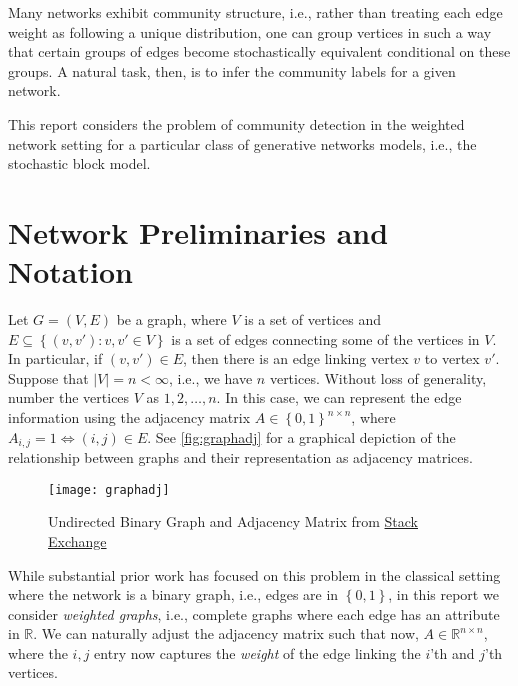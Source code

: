 \documentclass[11pt]{article}   %
\begin{document}
Many networks exhibit community structure, i.e., rather than treating each edge weight as following a unique distribution, one can group vertices in such a way that certain groups of edges become stochastically equivalent conditional on these groups.
A natural task, then, is to infer the community labels for a given network.

This report considers the problem of community detection in the weighted network setting for a particular class of generative networks models, i.e., the stochastic block model.

\section{Network Preliminaries and Notation}
\label{sec:netw-prel-notat}


Let $G=(V, E)$ be a graph, where $V$ is a set of vertices and $E \subseteq \left\{ (v, v') : v, v' \in V \right\}$ is a set of edges connecting some of the vertices in $V$.
In particular, if $(v, v') \in E$, then there is an edge linking vertex $v$ to vertex $v'$.
Suppose that $\lvert V \rvert = n < \infty$, i.e., we have $n$ vertices.
Without loss of generality, number the vertices $V$ as $1, 2, \ldots, n$.
In this case, we can represent the edge information using the adjacency matrix $A \in \left\{ 0, 1 \right\}^{n \times n}$, where $A_{i,j} = 1 \iff (i,j) \in E$.
See \autoref{fig:graphadj} for a graphical depiction of the relationship between graphs and their representation as adjacency matrices.

\begin{figure}[h]
  \centering
  \texttt{[image: graphadj]}
  \caption{Undirected Binary Graph and Adjacency Matrix from \href{https://cs.stackexchange.com/questions/71609/adjacency-matrix-and-recognizing-hierarchy}{Stack Exchange}}
  \label{fig:graphadj}
\end{figure}


While substantial prior work has focused on this problem in the classical setting where the network is a binary graph, i.e., edges are in $\left\{ 0,1 \right\}$, in this report we consider \emph{weighted graphs}, i.e., complete graphs where each edge has an attribute in $\mathbb{R}$.
We can naturally adjust the adjacency matrix such that now, $A \in \mathbb{R}^{n \times n}$, where the $i,j$ entry now captures the \emph{weight} of the edge linking the $i$'th and $j$'th vertices.
\end{document}
